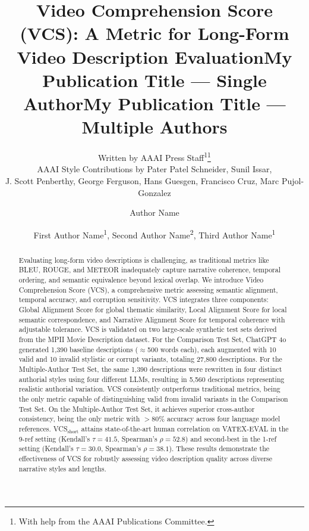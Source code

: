 \documentclass[letterpaper]{article} %
\title{Video Comprehension Score (VCS): A Metric for Long-Form Video Description Evaluation}
\author{
    Written by AAAI Press Staff\textsuperscript{\rm 1}\thanks{With help from the AAAI Publications Committee.}\\
    AAAI Style Contributions by Pater Patel Schneider,
    Sunil Issar,\\
    J. Scott Penberthy,
    George Ferguson,
    Hans Guesgen,
    Francisco Cruz\equalcontrib,
    Marc Pujol-Gonzalez\equalcontrib
}
\title{My Publication Title --- Single Author}
\author {
    Author Name
}
\title{My Publication Title --- Multiple Authors}
\author {
    First Author Name\textsuperscript{\rm 1},
    Second Author Name\textsuperscript{\rm 2},
    Third Author Name\textsuperscript{\rm 1}
}
\begin{document}
\maketitle

\begin{abstract}
Evaluating long-form video descriptions is challenging, as traditional metrics like BLEU, ROUGE, and METEOR inadequately capture narrative coherence, temporal ordering, and semantic equivalence beyond lexical overlap. We introduce Video Comprehension Score (VCS), a comprehensive metric assessing semantic alignment, temporal accuracy, and corruption sensitivity. VCS integrates three components: Global Alignment Score for global thematic similarity, Local Alignment Score for local semantic correspondence, and Narrative Alignment Score for temporal coherence with adjustable tolerance. VCS is validated on two large-scale synthetic test sets derived from the MPII Movie Description dataset. For the Comparison Test Set, ChatGPT 4o generated 1,390 baseline descriptions ($\approx$500 words each), each augmented with 10 valid and 10 invalid stylistic or corrupt variants, totaling 27,800 descriptions. For the Multiple-Author Test Set, the same 1,390 descriptions were rewritten in four distinct authorial styles using four different LLMs, resulting in 5,560 descriptions representing realistic authorial variation. VCS consistently outperforms traditional metrics, being the only metric capable of distinguishing valid from invalid variants in the Comparison Test Set. On the Multiple-Author Test Set, it achieves superior cross-author consistency, being the only metric with $>$80\% accuracy across four language model references. VCS$_{\text{short}}$ attains state-of-the-art human correlation on VATEX-EVAL in the 9-ref setting (Kendall's $\tau=41.5$, Spearman's $\rho=52.8$) and second-best in the 1-ref setting (Kendall's $\tau=30.0$, Spearman's $\rho=38.1$). These results demonstrate the effectiveness of VCS for robustly assessing video description quality across diverse narrative styles and lengths.
\end{abstract}

\end{document}
